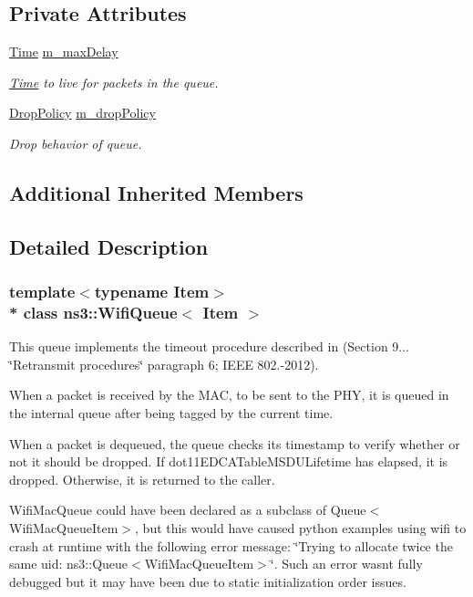 \subsection*{Private Attributes}
\begin{DoxyCompactItemize}
\item 
\hyperlink{classns3_1_1Time}{Time} \hyperlink{classns3_1_1WifiQueue_a03250df9a7461abb71034e610c193093}{m\+\_\+max\+Delay}
\begin{DoxyCompactList}\small\item\em \hyperlink{classns3_1_1Time}{Time} to live for packets in the queue. \end{DoxyCompactList}\item 
\hyperlink{classns3_1_1WifiQueue_a31cd8cafb8f3f8d162183f2a1754eddc}{Drop\+Policy} \hyperlink{classns3_1_1WifiQueue_a0dd5aa1773f1bba30d03e07f63e6dc30}{m\+\_\+drop\+Policy}
\begin{DoxyCompactList}\small\item\em Drop behavior of queue. \end{DoxyCompactList}\end{DoxyCompactItemize}
\subsection*{Additional Inherited Members}


\subsection{Detailed Description}
\subsubsection*{template$<$typename Item$>$\\*
class ns3\+::\+Wifi\+Queue$<$ Item $>$}

This queue implements the timeout procedure described in (Section 9... \char`\"{}\+Retransmit procedures\char`\"{} paragraph 6; I\+E\+EE 802.-\/2012).

When a packet is received by the M\+AC, to be sent to the P\+HY, it is queued in the internal queue after being tagged by the current time.

When a packet is dequeued, the queue checks its timestamp to verify whether or not it should be dropped. If dot11\+E\+D\+C\+A\+Table\+M\+S\+D\+U\+Lifetime has elapsed, it is dropped. Otherwise, it is returned to the caller.

Wifi\+Mac\+Queue could have been declared as a subclass of Queue$<$\+Wifi\+Mac\+Queue\+Item$>$, but this would have caused python examples using wifi to crash at runtime with the following error message\+: \char`\"{}\+Trying to allocate twice the same uid\+:
ns3\+::\+Queue$<$\+Wifi\+Mac\+Queue\+Item$>$\char`\"{}. Such an error wasn\textquotesingle{}t fully debugged but it may have been due to static initialization order issues.

